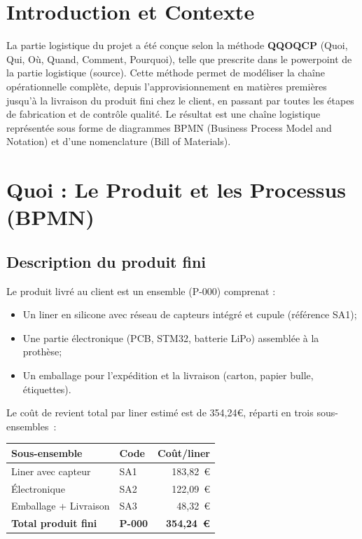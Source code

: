 \section{Introduction et Contexte}

La partie logistique du projet a été conçue selon la méthode \textbf{QQOQCP}
(Quoi, Qui, Où, Quand, Comment, Pourquoi), telle que prescrite dans le powerpoint de la partie logistique (source).
Cette méthode permet de modéliser la chaîne opérationnelle complète, depuis l'approvisionnement en matières
premières jusqu'à la livraison du produit fini chez le client, en passant par toutes les étapes de
fabrication et de contrôle qualité. Le résultat est une chaîne logistique représentée sous forme de diagrammes BPMN (Business Process Model and Notation) et d'une
nomenclature (Bill of Materials).

\section{Quoi : Le Produit et les Processus (BPMN)}

\subsection{Description du produit fini}

Le produit livré au client est un ensemble (P-000) comprenat :
\begin{itemize}
  \item Un liner en silicone avec réseau de capteurs intégré et cupule (référence SA1);
  \item Une partie électronique (PCB, STM32, batterie LiPo) assemblée à la prothèse;
  \item Un emballage pour l'expédition et la livraison (carton, papier bulle, étiquettes).
\end{itemize}

Le coût de revient total par liner estimé est de 354,24\euro{}, réparti en trois sous-ensembles~:

\begin{center}
\begin{tabular}{llr}
  \toprule
  \textbf{Sous-ensemble} & \textbf{Code} & \textbf{Coût/liner} \\
  \midrule
  Liner avec capteur     & SA1           & 183,82~\euro{} \\
  Électronique           & SA2           & 122,09~\euro{}       \\
  Emballage + Livraison  & SA3           & 48,32~\euro{}        \\
  \midrule
  \textbf{Total produit fini} & \textbf{P-000} & \textbf{354,24~\euro{}} \\
  \bottomrule
\end{tabular}
\end{center}
\vspace{0.5cm}

